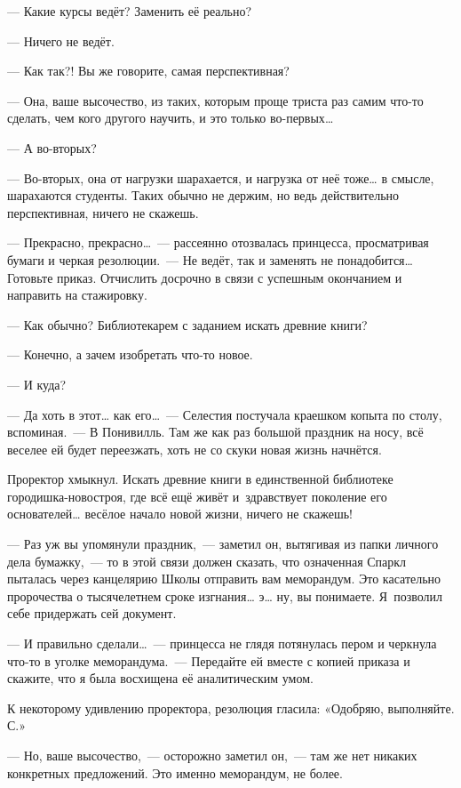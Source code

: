 \documentclass[fontsize=11pt,a5paper,titlepage=firstcover]{scrbook}
\begin{document}
--- Какие курсы ведёт? Заменить её реально?

--- Ничего не ведёт.

--- Как так?! Вы же говорите, самая перспективная?

--- Она, ваше высочество, из таких, которым проще триста раз самим что-то сделать, чем кого другого научить, и это только во-первых{\ldots}

--- А во-вторых?

--- Во-вторых, она от нагрузки шарахается, и нагрузка от неё тоже{\ldots} в смысле, шарахаются студенты. Таких обычно не держим, но ведь действительно перспективная, ничего не скажешь.

--- Прекрасно, прекрасно{\ldots}~--- рассеянно отозвалась принцесса, просматривая бумаги и черкая резолюции.~--- Не ведёт, так и заменять не понадобится{\ldots} Готовьте приказ. Отчислить досрочно в связи с успешным окончанием и направить на стажировку.

--- Как обычно? Библиотекарем с заданием искать древние книги?

--- Конечно, а зачем изобретать что-то новое.

--- И куда?

--- Да хоть в этот{\ldots} как его{\ldots}~--- Селестия постучала краешком копыта по столу, вспоминая.~--- В Понивилль. Там же как раз большой праздник на носу, всё веселее ей будет переезжать, хоть не со скуки новая жизнь начнётся.

Проректор хмыкнул. Искать древние книги в единственной библиотеке городишка-новостроя, где всё ещё живёт и~здравствует поколение его основателей{\ldots} весёлое начало новой жизни, ничего не скажешь!

--- Раз уж вы упомянули праздник,~--- заметил он, вытягивая из папки личного дела бумажку,~--- то в этой связи должен сказать, что означенная Спаркл пыталась через канцелярию Школы отправить вам меморандум. Это касательно пророчества о тысячелетнем сроке изгнания{\ldots} э{\ldots} ну, вы понимаете. Я~позволил себе придержать сей документ.

--- И правильно сделали{\ldots}~--- принцесса не глядя потянулась пером и черкнула что-то в уголке меморандума.~--- Передайте ей вместе с копией приказа и скажите, что я была восхищена её аналитическим умом.

К некоторому удивлению проректора, резолюция гласила: «Одобряю, выполняйте. С.»

--- Но, ваше высочество,~--- осторожно заметил он,~--- там же нет никаких конкретных предложений. Это именно меморандум, не более.
\end{document}
